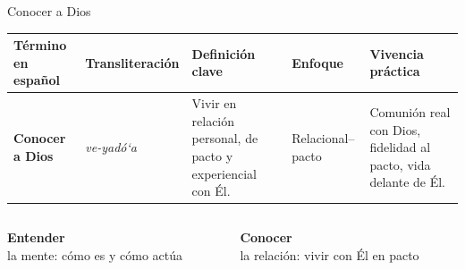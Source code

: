 \documentclass[hyperref={bookmarks=false},aspectratio=169]{beamer}
\newcommand{\destacar}[1]{\textbf{\textcolor{azulp}{#1}}}
\begin{document}
\begin{frame}{Conocer a Dios}
\scriptsize
\begin{tabular}{@{}P{1.6cm} P{1.5cm} P{3.8cm} P{1.4cm} P{2.2cm}@{}}
\toprule
\textbf{Término en español} & \textbf{Transliteración} & \textbf{Definición clave} & \textbf{Enfoque} & \textbf{Vivencia práctica} \\ \midrule
\destacar{Conocer a Dios} & \emph{ve-yadó‘a} & Vivir en relación personal, de pacto y experiencial con Él. & Relacional–pacto & Comunión real con Dios, fidelidad al pacto, vida delante de Él. \\ \bottomrule
\end{tabular}
\vspace{12pt}

\begin{columns}[c,onlytextwidth]
\begin{column}{0.48\textwidth}
\begin{tcolorbox}[colback=azulcl,colframe=azulp,boxrule=0.8pt,arc=3pt,fontupper=\small,halign=center]
\textbf{Entender}\\ la mente: cómo es y cómo actúa
\end{tcolorbox}
\end{column}
\begin{column}{0.48\textwidth}
\begin{tcolorbox}[colback=azulcl,colframe=azulp,boxrule=0.8pt,arc=3pt,fontupper=\small,halign=center]
\textbf{Conocer}\\ la relación: vivir con Él en pacto
\end{tcolorbox}
\end{column}
\end{columns}
\end{frame}
\end{document}
